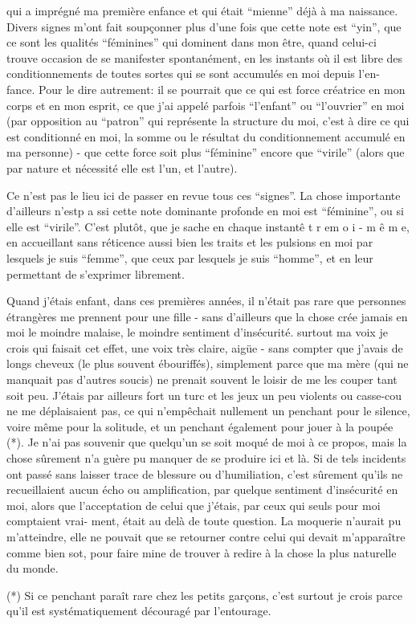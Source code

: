 qui a imprégné ma première enfance et qui était ``mienne'' déjà à ma naissance.
Divers signes m'ont fait soupçonner plus d'une fois que cette note est ``yin'',
que ce sont les qualités ``féminines'' qui dominent dans mon être, quand celui-ci
trouve occasion de se manifester spontanément, en les instants où il est libre
des conditionnements de toutes sortes qui se sont accumulés en moi depuis l'en-\newline
fance. Pour le dire autrement: il se pourrait que ce qui est force créatrice en
mon corps et en mon esprit, ce que j'ai appelé parfois ``l'enfant'' ou ``l'ouvrier''
en moi (par opposition au ``patron'' qui représente la structure du moi, c'est à
dire ce qui est conditionné en moi, la somme ou le résultat du conditionnement
accumulé en ma personne) - que cette force soit plus ``féminine'' encore que
``virile'' (alors que par nature et nécessité elle est l'un, et l'autre).

Ce n'est pas le lieu ici de passer en revue tous ces ``signes''. La chose
importante d'ailleurs n'est\quad p a s\quad si cette note dominante profonde en moi
est ``féminine'', ou si elle est ``virile''. C'est plutôt, que je sache en chaque
instant\quad ê t r e\quad m o i - m ê m e\quad, en accueillant sans réticence aussi bien
les traits et les pulsions en moi par lesquels je\unsure{:} suis ``femme'', que ceux par
lesquels je suis ``homme'', et en leur permettant de s'exprimer librement.

Quand j'étais enfant, dans ces premières années, il n'était pas rare que 
personnes étrangères me prennent pour une fille - sans d'ailleurs que la chose
crée jamais en moi le moindre malaise, le moindre sentiment d'insécurité. 
surtout ma voix je crois qui faisait cet effet, une voix très claire, aigüe -
sans compter que j'avais de longs cheveux (le plus souvent ébouriffés), 
simplement parce que ma mère (qui ne manquait pas d'autres soucis) ne prenait 
souvent le loisir de me les couper tant soit peu. J'étais par ailleurs fort 
un turc et les jeux un peu violents ou casse-cou ne me déplaisaient pas, ce qui
n'empêchait nullement un penchant pour le silence, voire même pour la solitude,
et un penchant également pour jouer à la poupée (*). Je n'ai pas souvenir que
quelqu'un se soit moqué de moi à ce propos, mais la chose sûrement n'a guère pu
manquer de se produire ici et là. Si de tels incidents ont passé sans laisser
trace de blessure ou d'humiliation, c'est sûrement qu'ils ne recueillaient aucun
écho ou amplification, par quelque sentiment d'insécurité en moi, alors que
l'acceptation de celui que j'étais, par ceux qui seuls pour moi comptaient vrai-\newline
ment, était au delà de toute question. La moquerie n'aurait pu m'atteindre,
elle ne pouvait que se retourner contre celui qui devait m'apparaître comme bien
sot, pour faire mine de trouver à redire à la chose la plus naturelle du monde.

(*) Si ce penchant paraît rare chez les petits garçons, c'est surtout je crois
parce qu'il est systématiquement découragé par l'entourage.
